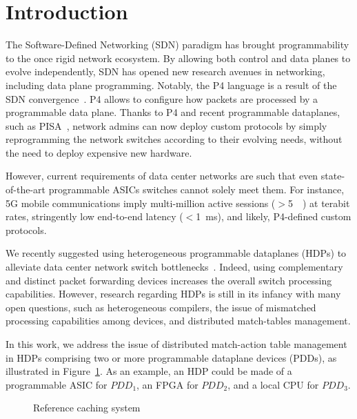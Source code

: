 \section{Introduction}\label{sec:intro}

The Software-Defined Networking (SDN) paradigm has brought programmability to the once rigid network ecosystem.
By allowing both control and data planes to evolve independently, SDN has opened new research avenues in networking, including data plane programming.
Notably, the P4 language is a result of the SDN convergence~\cite{Bosshart:14}.
P4 allows to configure how packets are processed by a programmable data plane. 
Thanks to P4 and recent programmable dataplanes, such as PISA~\cite{Bosshart:13}, network admins can now deploy custom protocols by simply reprogramming the network switches according to their evolving needs, without the need to deploy expensive new hardware. 


However, current requirements of data center networks are such that even state-of-the-art programmable ASICs switches cannot solely meet them.
For instance, 5G mobile communications imply multi-million active sessions ($>$\SI{5}{\mega\nothing}) at terabit rates, stringently low end-to-end latency ($<$\SI{1}{\milli\second}), and likely, P4-defined custom protocols.

We recently suggested using heterogeneous programmable dataplanes (HDPs) to alleviate data center network switch bottlenecks~\cite{p4eu:18}.
Indeed, using complementary and distinct packet forwarding devices increases the overall switch processing capabilities.
However, research regarding HDPs is still in its infancy with many open questions, such as heterogeneous compilers, the issue of mismatched processing capabilities among devices, and distributed match-tables management.

In this work, we address the issue of distributed match-action table management in HDPs comprising two or more programmable dataplane devices (PDDs), as illustrated in Figure~\ref{fig:high_level_network}.
As an example, an HDP could be made of a programmable ASIC for $PDD_1$, an  FPGA for $PDD_2$, and a local CPU for $PDD_3$.

\begin{figure}[]
	\centering
	
	\caption{Reference caching system}
	\label{fig:high_level_network}
\end{figure}

